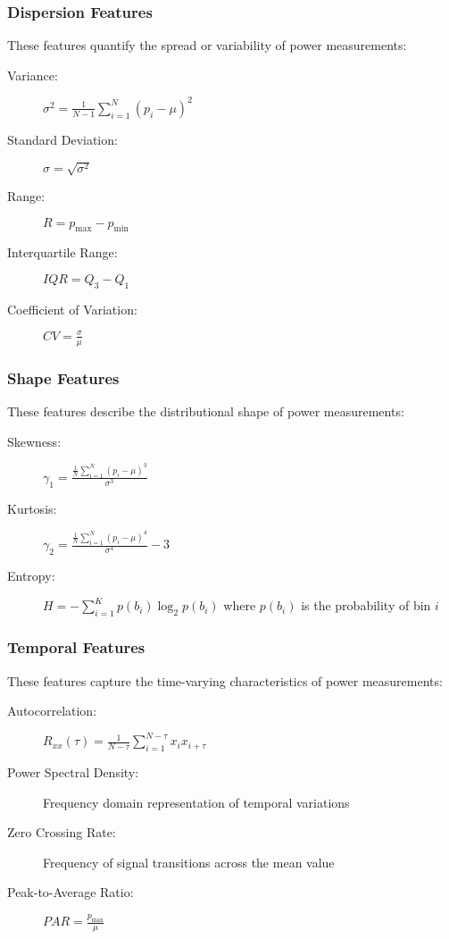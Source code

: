 \subsubsection{Dispersion Features}
These features quantify the spread or variability of power measurements:

\begin{description}
\item[Variance:] $\sigma^2 = \frac{1}{N-1} \sum_{i=1}^{N} (p_i - \mu)^2$
\item[Standard Deviation:] $\sigma = \sqrt{\sigma^2}$
\item[Range:] $R = p_{\max} - p_{\min}$
\item[Interquartile Range:] $IQR = Q_3 - Q_1$
\item[Coefficient of Variation:] $CV = \frac{\sigma}{\mu}$
\end{description}

\subsubsection{Shape Features}
These features describe the distributional shape of power measurements:

\begin{description}
\item[Skewness:] $\gamma_1 = \frac{\frac{1}{N} \sum_{i=1}^{N} (p_i - \mu)^3}{\sigma^3}$
\item[Kurtosis:] $\gamma_2 = \frac{\frac{1}{N} \sum_{i=1}^{N} (p_i - \mu)^4}{\sigma^4} - 3$
\item[Entropy:] $H = -\sum_{i=1}^{K} p(b_i) \log_2 p(b_i)$ where $p(b_i)$ is the probability of bin $i$
\end{description}

\subsubsection{Temporal Features}
These features capture the time-varying characteristics of power measurements:

\begin{description}
\item[Autocorrelation:] $R_{xx}(\tau) = \frac{1}{N-\tau} \sum_{i=1}^{N-\tau} x_i x_{i+\tau}$
\item[Power Spectral Density:] Frequency domain representation of temporal variations
\item[Zero Crossing Rate:] Frequency of signal transitions across the mean value
\item[Peak-to-Average Ratio:] $PAR = \frac{p_{\max}}{\mu}$
\end{description}

